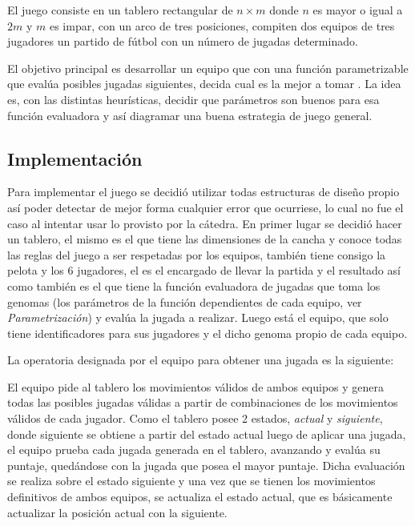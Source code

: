 
El juego consiste en un tablero rectangular de $n \times m$ donde $n$ es mayor o
igual a $2m$ y $m$ es impar, con un arco de tres posiciones, compiten dos
equipos de tres jugadores un partido de fútbol con un número de jugadas
determinado.


El objetivo principal es desarrollar un equipo que con una función parametrizable
que evalúa posibles jugadas siguientes, decida cual es la mejor a tomar
. La idea es, con las distintas heurísticas, decidir que parámetros son buenos para esa
función evaluadora y así diagramar una buena estrategia de juego general.\\

\subsection{Implementación}


Para implementar el juego se decidió utilizar todas estructuras de diseño propio
así poder detectar de mejor forma cualquier error que ocurriese, lo cual no fue
el caso al intentar usar lo provisto por la cátedra. En primer lugar se decidió
hacer un tablero, el mismo es el que tiene las dimensiones de la cancha y conoce
todas las reglas del juego a ser respetadas por los equipos, también tiene
consigo la pelota y los 6 jugadores, el es el encargado de llevar la partida y
el resultado así como también es el que tiene la función evaluadora de jugadas
que toma los genomas (los parámetros de la función dependientes de cada equipo,
ver {\it Parametrización\/}) y evalúa la jugada a realizar. Luego está el
equipo, que solo tiene identificadores para sus jugadores y el dicho genoma
propio de cada equipo.


La operatoria designada por el equipo para obtener una jugada es la siguiente:

El equipo pide al tablero los movimientos válidos de ambos equipos y genera todas las
posibles jugadas válidas a partir de combinaciones de los movimientos válidos de
cada jugador. Como el tablero posee 2 estados, {\it actual\/} y {\it
  siguiente}, donde siguiente se obtiene a partir del estado actual luego de
aplicar una jugada, el equipo prueba cada jugada generada en el tablero,
avanzando y evalúa su puntaje, quedándose con la jugada que posea el mayor
puntaje. Dicha evaluación se realiza sobre el estado siguiente y una vez que se
tienen los movimientos definitivos de ambos equipos, se actualiza el estado
actual, que es básicamente actualizar la posición actual con la siguiente.

